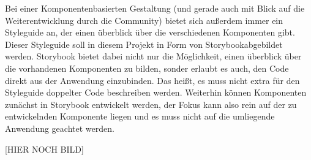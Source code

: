 
Bei einer Komponentenbasierten Gestaltung (und gerade auch mit Blick auf die Weiterentwicklung durch die Community) bietet sich außerdem immer ein Styleguide an, der einen überblick über die verschiedenen Komponenten gibt. Dieser Styleguide soll in diesem Projekt in Form von Storybook\footnotemark abgebildet werden.
Storybook bietet dabei nicht nur die Möglichkeit, einen überblick über die vorhandenen Komponenten zu bilden, sonder erlaubt es auch, den Code direkt aus der Anwendung einzubinden. Das heißt, es muss nicht extra für den Styleguide doppelter Code beschreiben werden. Weiterhin können Komponenten zunächst in Storybook entwickelt werden, der Fokus kann also rein auf der zu entwickelnden Komponente liegen und es muss nicht auf die umliegende Anwendung geachtet werden.


[HIER NOCH BILD]
